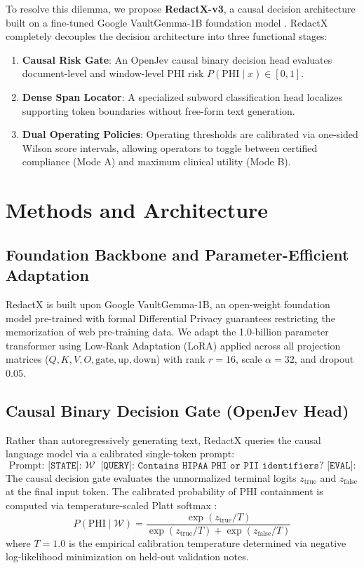 \documentclass[11pt,a4paper]{article}
\begin{document}
To resolve this dilemma, we propose \textbf{RedactX-v3}, a causal decision architecture built on a fine-tuned Google VaultGemma-1B foundation model \cite{vaultgemma2024}. RedactX completely decouples the decision architecture into three functional stages:
\begin{enumerate}
    \item \textbf{Causal Risk Gate}: An OpenJev causal binary decision head evaluates document-level and window-level PHI risk $P(\text{PHI} \mid x) \in [0, 1]$.
    \item \textbf{Dense Span Locator}: A specialized subword classification head localizes supporting token boundaries without free-form text generation.
    \item \textbf{Dual Operating Policies}: Operating thresholds are calibrated via one-sided Wilson score intervals, allowing operators to toggle between certified compliance (Mode A) and maximum clinical utility (Mode B).
\end{enumerate}

\section{Methods and Architecture}

\subsection{Foundation Backbone and Parameter-Efficient Adaptation}
RedactX is built upon Google VaultGemma-1B, an open-weight foundation model pre-trained with formal Differential Privacy guarantees \cite{abadi2016deep, vaultgemma2024} restricting the memorization of web pre-training data. We adapt the 1.0-billion parameter transformer using Low-Rank Adaptation (LoRA) \cite{hu2021lora} applied across all projection matrices ($Q, K, V, O, \text{gate}, \text{up}, \text{down}$) with rank $r=16$, scale $\alpha=32$, and dropout 0.05.

\subsection{Causal Binary Decision Gate (OpenJev Head)}
Rather than autoregressively generating text, RedactX queries the causal language model via a calibrated single-token prompt:
\begin{equation}
    \text{Prompt: } \texttt{[STATE]: } \mathcal{W} \;\; \texttt{[QUERY]: Contains HIPAA PHI or PII identifiers? [EVAL]:}
\end{equation}
The causal decision gate evaluates the unnormalized terminal logits $z_{\text{true}}$ and $z_{\text{false}}$ at the final input token. The calibrated probability of PHI containment is computed via temperature-scaled Platt softmax \cite{platt1999probabilistic}:
\begin{equation}
    P(\text{PHI} \mid \mathcal{W}) = \frac{\exp(z_{\text{true}} / T)}{\exp(z_{\text{true}} / T) + \exp(z_{\text{false}} / T)}
\end{equation}
where $T = 1.0$ is the empirical calibration temperature determined via negative log-likelihood minimization on held-out validation notes.
\end{document}
